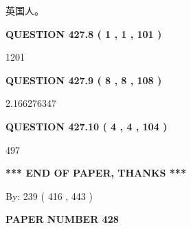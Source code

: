 \documentclass{ctexart}
\begin{document}
  
 
 
\noindent{}
 
 
英国人。
 
 
 
 
  
\vspace{0.2in}
  
{\textbf{\Large{QUESTION
427.8 
 ( 1 , 1 , 101 )
}}}
  
  
 
 
\noindent{}

1201
 
 
  
\vspace{0.2in}
  
{\textbf{\Large{QUESTION
427.9 
 ( 8 , 8 , 108 )
}}}
  
  
 
 
\noindent{}

2.166276347
 
 
  
\vspace{0.2in}
  
{\textbf{\Large{QUESTION
427.10 
 ( 4 , 4 , 104 )
}}}
  
  
 
 
\noindent{}

497
 
 
   
   
 \vspace{0.2in}
 
   
   
   
   
\vspace{1.0in} 
{\textbf{\large{ *** END OF PAPER, THANKS *** }}} 
   
   
\hspace{1.0in} By: 
 239 ( 416 ,  443 )
   
   
   
   
\newpage 
\setcounter{page}{ 
   428001 } 
   
   
   
   
 {\textbf{ \Large{ PAPER NUMBER  428  }}}
   
   
\vspace{0.2in}
   
\end{document}
